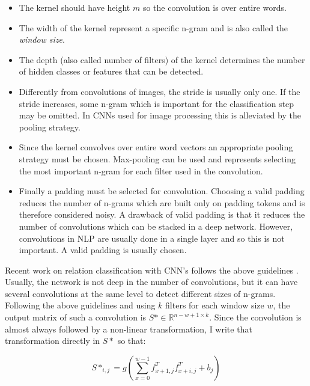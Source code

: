 \begin{itemize}
\item The kernel should have height $m$ so the convolution is over entire words.

\item The width of the kernel represent a specific n-gram and is also called the \emph{window size}.

\item The depth (also called number of filters) of the kernel determines the number of hidden classes or features that can be detected. 

\item Differently from convolutions of images, the stride is usually only one. If the stride increases, some n-gram which is important for the classification step may be omitted. In CNNs used for image processing this is alleviated by the pooling strategy.

\item Since the kernel convolves over entire word vectors an appropriate pooling strategy must be chosen. Max-pooling can be used and represents selecting the most important n-gram for each filter used in the convolution. 

\item Finally a padding must be selected for convolution. Choosing a valid padding reduces the number of n-grams which are built only on padding tokens and is therefore considered noisy. A drawback of valid padding is that it reduces the number of convolutions which can be stacked in a deep network. However, convolutions in NLP are usually done in a single layer and so this is not important. A valid padding is usually chosen.

\end{itemize}   

Recent work on relation classification with CNN's follows the above guidelines \citep{att_cn}\citep{re_cnn}\citep{cnn_rank}. Usually, the network is not deep in the number of convolutions, but it can have several convolutions at the same level to detect different sizes of n-grams. Following the above guidelines and using $k$ filters for each window size $w$, the output matrix of such a convolution is $S* \in \mathbb{R}^{n-w+1 \times k}$. Since the convolution is almost always followed by a non-linear transformation, I write that transformation directly in $S*$ so that:

\begin{equation}
S*_{i,j} = g( \sum_{x=0}^{w-1} f_{x+1,j}^{T} f_{x+i,j}^{T} + b_j) \label{eq:conv}
\end{equation}

